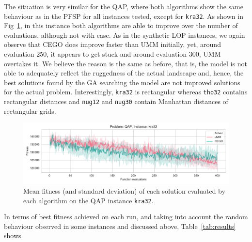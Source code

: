 \documentclass[runningheads]{llncs}
\begin{document}
The situation is very similar for the QAP, where both algorithms show the same
behaviour as in the PFSP for all instances tested, except for
\texttt{kra32}. As shown in Fig~\ref{fig:kra32}, in this instance both
algorithms are able to improve over the number of evaluations, although not
with ease. As in the synthetic LOP instances, we again observe that CEGO does
improve faster than UMM initially, yet, around evaluation 250, it appears to
get stuck and around evaluation 300, UMM overtakes it. We believe the reason is
the same as before, that is, the model is not able to adequately reflect the
ruggedness of the actual landscape and, hence, the best solutions found by the
GA searching the model are not improved solutions for the actual problem. Interestingly, \texttt{kra32} is rectangular
whereas \texttt{tho32} contains rectangular distances and \texttt{nug12} and \texttt{nug30} contain Manhattan distances of rectangular grids.

\begin{figure}
  \centering%
  \includegraphics[width=\textwidth]{img/fitness_real_qap_kra32_dat}
    \caption{Mean fitness  (and standard deviation)  of each solution evaluated by each algorithm on the QAP instance \texttt{kra32}.\label{fig:kra32}}
\end{figure}

In terms of best fitness achieved on each run, and taking into account the
random behaviour observed in some instances and discussed above,
Table~\ref{tab:results} shows
\end{document}
